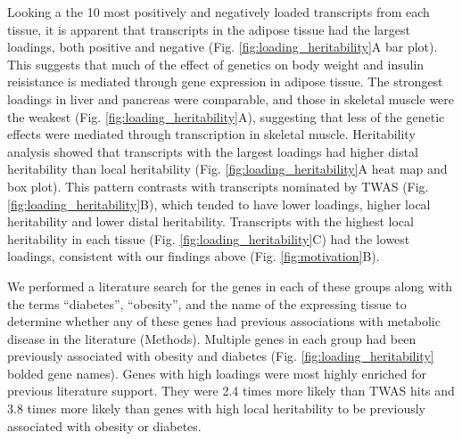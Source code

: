 \documentclass[
]{article}
\begin{document}
Looking a the 10 most positively and negatively loaded transcripts from
each tissue, it is apparent that transcripts in the adipose tissue had
the largest loadings, both positive and negative (Fig.
\ref{fig:loading_heritability}A bar plot). This suggests that much of
the effect of genetics on body weight and insulin reisistance is
mediated through gene expression in adipose tissue. The strongest
loadings in liver and pancreas were comparable, and those in skeletal
muscle were the weakest (Fig. \ref{fig:loading_heritability}A),
suggesting that less of the genetic effects were mediated through
transcription in skeletal muscle. Heritability analysis showed that
transcripts with the largest loadings had higher distal heritability
than local heritability (Fig. \ref{fig:loading_heritability}A heat map
and box plot). This pattern contrasts with transcripts nominated by TWAS
(Fig. \ref{fig:loading_heritability}B), which tended to have lower
loadings, higher local heritability and lower distal heritability.
Transcripts with the highest local heritability in each tissue (Fig.
\ref{fig:loading_heritability}C) had the lowest loadings, consistent
with our findings above (Fig. \ref{fig:motivation}B).

We performed a literature search for the genes in each of these groups
along with the terms ``diabetes'', ``obesity'', and the name of the
expressing tissue to determine whether any of these genes had previous
associations with metabolic disease in the literature (Methods).
Multiple genes in each group had been previously associated with obesity
and diabetes (Fig. \ref{fig:loading_heritability} bolded gene names).
Genes with high loadings were most highly enriched for previous
literature support. They were 2.4 times more likely than TWAS hits and
3.8 times more likely than genes with high local heritability to be
previously associated with obesity or diabetes.
\end{document}

